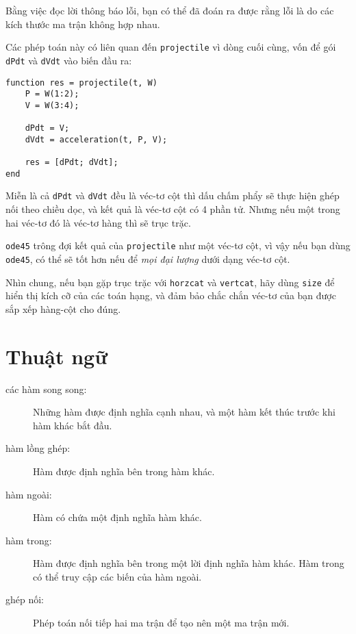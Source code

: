 \documentclass[12pt]{book}
\begin{document}
Bằng việc đọc lời thông báo lỗi, bạn có thể đã đoán ra được rằng
lỗi là do các kích thước ma trận không hợp nhau.

Các phép toán này có liên quan đến {\tt projectile} vì dòng cuối
cùng, vốn để gói {\tt dPdt} và {\tt dVdt} vào biến đầu ra:

\begin{verbatim}
function res = projectile(t, W)
    P = W(1:2);
    V = W(3:4);

    dPdt = V;                          
    dVdt = acceleration(t, P, V);

    res = [dPdt; dVdt];
end
\end{verbatim}
%
Miễn là cả {\tt dPdt} và {\tt dVdt} đều là véc-tơ cột thì 
dấu chấm phẩy sẽ thực hiện ghép nối theo chiều dọc, và
kết quả là véc-tơ cột có 4 phần tử. Nhưng nếu một trong
hai véc-tơ đó là véc-tơ hàng thì sẽ trục trặc. 

{\tt ode45} trông đợi kết quả của {\tt projectile} như một
véc-tơ cột, vì vậy nếu bạn dùng {\tt ode45}, có thể sẽ tốt hơn
nếu để {\em mọi đại lượng} dưới dạng véc-tơ cột.

Nhìn chung, nếu bạn gặp trục trặc với {\tt horzcat} và 
{\tt vertcat}, hãy dùng {\tt size} để hiển thị kích cỡ của
các toán hạng, và đảm bảo chắc chắn véc-tơ của bạn được
sắp xếp hàng-cột cho đúng.


\section{Thuật ngữ}

\begin{description}

\item[các hàm song song:] Những hàm được định nghĩa cạnh nhau,
và một hàm kết thúc trước khi hàm khác bắt đầu.

\item[hàm lồng ghép:] Hàm được định nghĩa bên trong hàm khác.

\item[hàm ngoài:] Hàm có chứa một định nghĩa hàm khác.

\item[hàm trong:] Hàm được định nghĩa bên trong một lời định nghĩa
hàm khác. Hàm trong có thể truy cập các biến của hàm ngoài.

\item[ghép nối:] Phép toán nối tiếp hai ma trận để tạo nên một
ma trận mới.


\end{description}
\end{document}
